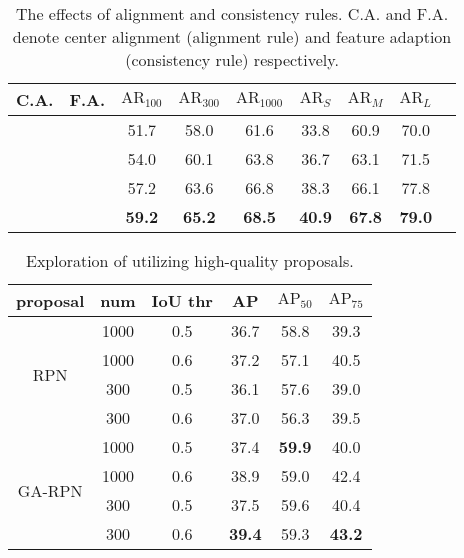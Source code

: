 \documentclass[10pt,twocolumn,letterpaper]{article}
\begin{document}
\begin{table}[t]
	\centering
	\caption{\small{The effects of alignment and consistency rules. C.A. and F.A. denote center alignment (alignment rule) and feature adaption (consistency rule) respectively.}}
	\addtolength{\tabcolsep}{-2pt}
	\small{
		\begin{tabular}{*{9}{c}}
			\toprule
			C.A.   & F.A.      & $\text{AR}_{100}$ & $\text{AR}_{300}$ & $\text{AR}_{1000}$ & $\text{AR}_{S}$ & $\text{AR}_{M}$ & $\text{AR}_{L}$ \\
			\midrule
			&          &              51.7              & 58.0              &  61.6              & 33.8            & 60.9            & 70.0         \\
			\checkmark &    &         54.0              & 60.1              & 63.8               & 36.7            & 63.1            & 71.5        \\
			& \checkmark &            57.2              & 63.6              & 66.8               & 38.3            & 66.1            & 77.8        \\
			\checkmark & \checkmark &  \textbf{59.2}     & \textbf{65.2}     & \textbf{68.5}      & \textbf{40.9}   & \textbf{67.8}   & \textbf{79.0}   \\
			\bottomrule
		\end{tabular}
	}
	\vspace{-0.2cm}
	\label{tab:alignment_consistency}
\end{table}

\begin{table}[t]
	\centering
	\caption{\small{Exploration of utilizing high-quality proposals.}}
	\addtolength{\tabcolsep}{-2pt}
	\small{
		\begin{tabular}{*{6}{c}}
			\toprule
			proposal                & num  & IoU thr & AP            & $\text{AP}_{50}$ & $\text{AP}_{75}$ \\
			\midrule
			\multirow{4}{*}{RPN}    & 1000 & 0.5         & 36.7          & 58.8             & 39.3             \\
			& 1000 & 0.6         & 37.2          & 57.1             & 40.5             \\
			& 300  & 0.5         & 36.1          & 57.6             & 39.0             \\
			& 300  & 0.6         & 37.0          & 56.3             & 39.5             \\
			\midrule
			\multirow{4}{*}{GA-RPN} & 1000 & 0.5         & 37.4          & \textbf{59.9}    & 40.0             \\
			& 1000 & 0.6         & 38.9          & 59.0             & 42.4             \\
			& 300  & 0.5         & 37.5          & 59.6             & 40.4             \\
			& 300  & 0.6         & \textbf{39.4} & 59.3             & \textbf{43.2}    \\
			\bottomrule
		\end{tabular}
	}
	\label{tab:proposal-utilization}
	\vspace{-10pt}
\end{table}
\end{document}
